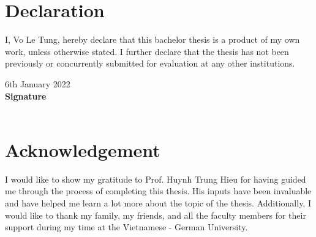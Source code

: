 \documentclass[a4paper,11pt]{report}
\begin{document}
\chapter*{Declaration}
I, Vo Le Tung, hereby declare that this bachelor thesis is a product of my own work, unless otherwise stated.
I further declare that the thesis has not been previously or concurrently submitted for evaluation at any other institutions.

\vspace{1cm}
\noindent 6th January 2022\\
\textbf{Signature}
\vspace{3cm}\\
\underline{\hspace{5cm}}\\

\chapter*{Acknowledgement}
I would like to show my gratitude to Prof. Huynh Trung Hieu for having guided me through the process of completing this thesis.
His inputs have been invaluable and have helped me learn a lot more about the topic of the thesis.
Additionally, I would like to thank my family, my friends, and all the faculty members for their support during my time at the Vietnamese - German University.
\tableofcontents

\listoffigures

\listoftables

\listofalgorithms

\newpage
{}













\printbibliography[title=References]



\printglossaries
\end{document}
